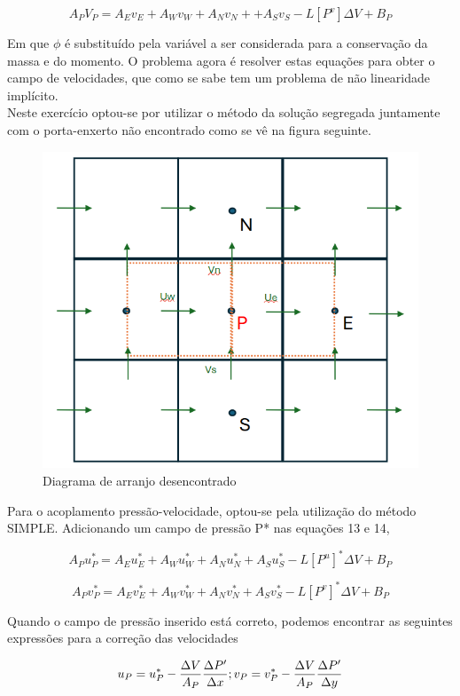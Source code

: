 \documentclass[]{article}
\begin{document}
\begin{equation}
	A_P V_P = A_E v_E + A_W v_W + A_N v_N + + A_S v_S - L \left[ P^v \right] \Delta V + B_P 
\end{equation}

Em que $\phi$ é substituído pela variável a ser considerada para a conservação da massa e do momento. O problema agora é resolver estas equações para obter o campo de velocidades, que como se sabe tem um problema de não linearidade implícito.\\

Neste exercício optou-se por utilizar o método da solução segregada juntamente com o porta-enxerto não encontrado como se vê na figura seguinte.

\begin{figure}[H]
	\centering
	\includegraphics[width=.65\textwidth]{figures/2}
	\caption{Diagrama de arranjo desencontrado}
\end{figure}

Para o acoplamento pressão-velocidade, optou-se pela utilização do método SIMPLE. Adicionando um campo de pressão P* nas equações 13 e 14,

\begin{equation}
	A_P u_P^{*} = A_E u_E^{*} + A_W u_W^{*} + A_N u_N^{*} + A_S u_S^{*} - L \left[ P^u \right]^{*} \Delta V + B_P
\end{equation}

\begin{equation}
	A_P v_P^{*} = A_E v_E^{*} + A_W v_W^{*} + A_N v_N^{*} + A_S v_S^{*} - L \left[ P^v \right]^{*} \Delta V + B_P 
\end{equation}


Quando o campo de pressão inserido está correto, podemos encontrar as seguintes expressões para a correção das velocidades

\begin{equation}
	u_P = u_P^* - \frac{\Delta V}{A_P} \frac{\Delta P'}{\Delta x}\\;
	v_P = v_P^* - \frac{\Delta V}{A_P} \frac{\Delta P'}{\Delta y}
\end{equation}
\end{document}

